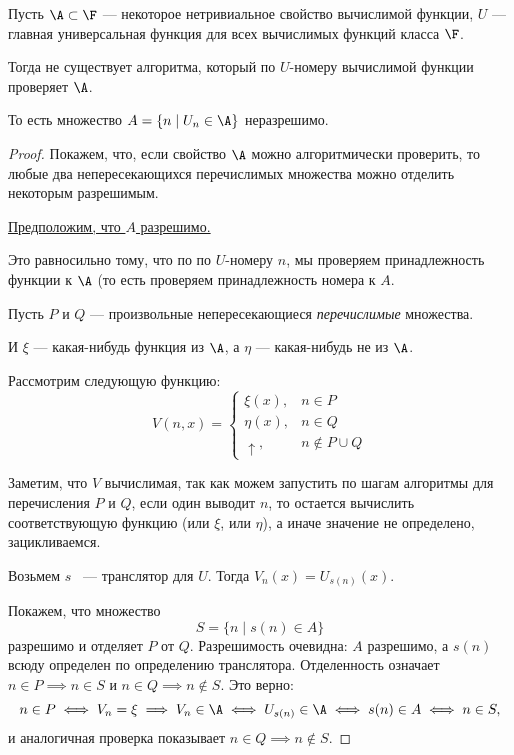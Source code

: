 \begin{thm}
	Пусть $ \A \subset \F$ --- некоторое нетривиальное свойство вычислимой функции, 
	$ U$ --- главная универсальная функция для всех вычислимых функций класса $ \F$.

	Тогда не существует алгоритма, который по  $ U$-номеру вычислимой функции проверяет $ \A$. 

	То есть множество $ A = \{n \mid U_n \in \A\}$ неразрешимо.
\end{thm}
\begin{proof}
    Покажем, что, если свойство $ \A$ можно алгоритмически проверить, то любые два непересекающихся перечислимых множества можно отделить некоторым разрешимым.
    
    \underline{Предположим, что $A$ разрешимо.}
    
    Это равносильно тому, что по по $U$-номеру $n$, мы проверяем принадлежность функции к $\A$ (то есть проверяем принадлежность номера к $A$.

	Пусть $ P$ и $ Q$ --- произвольные непересекающиеся \textit{перечислимые} множества. 

	И $ \xi$ --- какая-нибудь функция из $ \A$, а $ \eta$ --- какая-нибудь не из $ \A$.

	Рассмотрим следующую функцию:
	\[
		V(n, x) = 
		\begin{cases}
			\xi(x), & n \in P \\
			\eta(x), & n \in Q\\
			\uparrow, & n \notin P \cup Q
		\end{cases}
	\] 

	Заметим, что $ V$ вычислимая, так как можем запустить по шагам алгоритмы для перечисления $ P$ и $ Q$, если один выводит $n$, то остается вычислить соответствующую функцию (или $\xi$, или $\eta$), а иначе значение не определено, зацикливаемся.
	
	Возьмем $s$ ~--- транслятор для $U$. Тогда $V_n(x) = U_{s(n)}(x)$. 


	Покажем, что множество 
	$$S = \{n \mid s(n) \in A\}$$ 
	разрешимо и отделяет $P$ от $Q$. Разрешимость очевидна: $A$ разрешимо, а $s(n)$ всюду определен по определению транслятора. Отделенность означает $n \in P \implies n \in S$ и $n \in Q \implies n \notin S$. Это верно:
	$$n \in P \iff V_n = \xi \implies V_n \in \A \iff U_{s(n)} \in \A \iff s(n) \in A \iff n \in S,$$
	и аналогичная проверка показывает $n \in Q \implies n \notin S$.
	
\end{proof}

